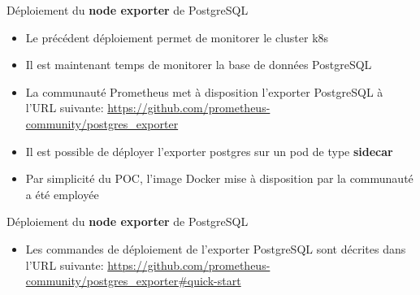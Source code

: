 \begin{frame}[fragile]{Déploiement du \textbf{node exporter} de PostgreSQL}

\begin{itemize}
   \item Le précédent déploiement permet de monitorer le cluster k8s
   \item Il est maintenant temps de monitorer la base de données PostgreSQL
   \item La communauté Prometheus met à disposition l'exporter PostgreSQL à l'URL suivante:
   \url{https://github.com/prometheus-community/postgres_exporter}
   \item Il est possible de déployer l'exporter postgres sur un pod de type \textbf{sidecar}
   \item Par simplicité du POC, l'image Docker mise à disposition par la communauté a été employée
\end{itemize}

\end{frame}


\begin{frame}[fragile]{Déploiement du \textbf{node exporter} de PostgreSQL}


\begin{itemize}
   \item Les commandes de déploiement de l'exporter PostgreSQL sont décrites dans l'URL suivante: \url{https://github.com/prometheus-community/postgres_exporter#quick-start}
\end{itemize}

\end{frame}


